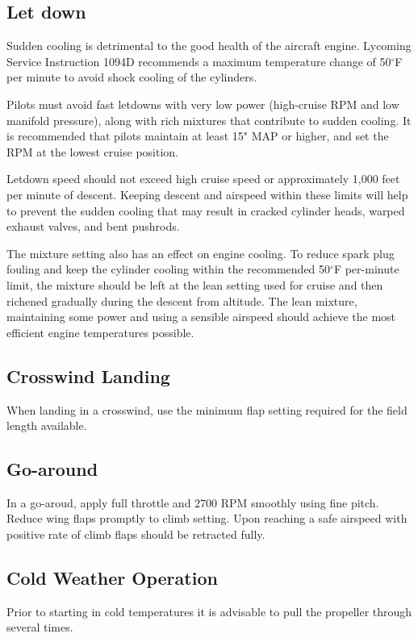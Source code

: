 \subsection{Let down}
Sudden cooling is detrimental to the good health of the aircraft engine. Lycoming Service Instruction 1094D recommends a maximum temperature change of 50${^\circ}$F per minute to avoid shock cooling of the cylinders.

Pilots must avoid fast letdowns with very low power (high-cruise RPM and low manifold pressure), along with rich mixtures that contribute to sudden cooling. It is recommended that pilots maintain at least 15" MAP or higher, and set the RPM at the lowest cruise position. 

Letdown speed should not exceed high cruise speed or approximately 1,000 feet per minute of descent. Keeping descent and airspeed within these limits will help to prevent the sudden cooling that may result in cracked cylinder heads, warped exhaust valves, and bent pushrods.

The mixture setting also has an effect on engine cooling. To reduce spark plug fouling and keep the cylinder cooling within the recommended 50${^\circ}$F per-minute limit, the mixture should be left at the lean setting used for cruise and then richened gradually during the descent from altitude. The lean mixture, maintaining some power and using a sensible airspeed should achieve the most efficient engine temperatures possible.

\subsection{Crosswind Landing }
When landing in a crosswind, use the minimum flap setting required for the field length available.

\subsection{Go-around }
In a go-aroud, apply full throttle and 2700 RPM smoothly using fine pitch.  Reduce wing flaps promptly to climb setting.   Upon reaching a safe airspeed with positive rate of climb flaps should be retracted fully.

\subsection{Cold Weather Operation}
Prior to starting in cold temperatures it is advisable to pull the propeller through several times.  

